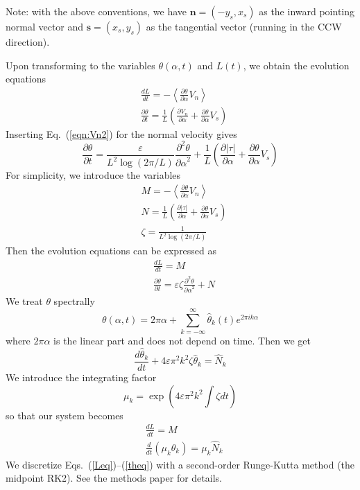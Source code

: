 \documentclass[11pt]{article}
\newcommand{\ppd}[2]  { \frac{\partial^2 #1}{{\partial #2}^2} }
\newcommand{\abs}[1]{\left| #1 \right|}
\newcommand{\mean}[1]{\left< #1 \right>}
\newcommand{\eps}{\varepsilon}
\newcommand{\atau}{\abs{\tau}}
\renewcommand{\ss}{{\mathbf{s}}}
\newcommand{\nn}{{\mathbf{n}}}
\newcommand{\pderiv}[2]{\frac{\partial #1}{\partial #2}}
\newcommand{\tderiv}[2]{\frac{d #1}{d #2}}
\newcommand{\Vn}{V_n}
\newcommand{\Vs}{V_s}
\newcommand{\thalpha}{\pderiv{\theta}{\alpha}}
\newcommand{\elfun}{\zeta}
\newcommand{\thhat}{\hat{\theta}}
\begin{document}
Note: with the above conventions, we have $\nn = (-y_s, x_s)$ as the inward pointing normal vector and $\ss = (x_s, y_s)$ as the tangential vector (running in the CCW direction). 

Upon transforming to the variables $\theta(\alpha,t)$ and $L(t)$, we obtain the evolution equations
\begin{align}
& \tderiv{L}{t} = - \mean{\thalpha \Vn} \\
& \pderiv{\theta}{t} = \frac{1}{L} \left( \pderiv{\Vn}{\alpha} + \thalpha \Vs \right)
\end{align}
Inserting Eq.~(\ref{eqn:Vn2}) for the normal velocity gives
\begin{equation}
\pderiv{\theta}{t} = \frac{\eps}{L^{2} \log \left(2\pi/L \right)} \ppd{\theta}{\alpha} 
+ \frac{1}{L} \left( \pderiv{\atau}{\alpha} + \thalpha \Vs \right)
\end{equation}
For simplicity, we introduce the variables
\begin{align}
& M = - \mean{\thalpha \Vn} \\
& N = \frac{1}{L} \left( \pderiv{\atau}{\alpha} + \thalpha \Vs \right) \\
& \elfun = \frac{1}{L^{2} \log \left(2\pi/L \right)}
\end{align}
Then the evolution equations can be expressed as
\begin{align}
& \tderiv{L}{t} = M \\
& \pderiv{\theta}{t} = \eps \elfun \ppd{\theta}{\alpha} + N
\end{align}
We treat $\theta$ spectrally
\begin{equation}
\theta(\alpha,t) = 2 \pi \alpha + \sum_{k = -\infty}^{\infty} \thhat_k(t) e^{2\pi i k \alpha}
\end{equation}
where $2 \pi \alpha$ is the linear part and does not depend on time. Then we get
\begin{equation}
\label{thODEs}
\tderiv{\thhat_k}{t} +  4 \eps \pi^2 k^2  \elfun \thhat_k = \hat{N}_k
\end{equation}
We introduce the integrating factor
\begin{equation}
\mu_k = \exp \left( 4 \eps \pi^2 k^2 \int \elfun dt \right)
\end{equation}
so that our system becomes
\begin{align}
\label{Leq}
& \tderiv{L}{t} = M \\
\label{theq}
& \tderiv{}{t}\left( \mu_k \theta_k \right) = \mu_k \hat{N}_k
\end{align}
We discretize Eqs.~(\ref{Leq})--(\ref{theq}) with a second-order Runge-Kutta method (the midpoint RK2). See the methods paper for details.
\end{document}

